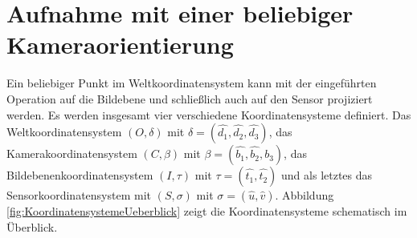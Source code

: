 
\pagebreak


\section{Aufnahme mit einer beliebiger Kameraorientierung}

Ein beliebiger Punkt im Weltkoordinatensystem kann mit der eingeführten Operation auf die Bildebene und schließlich auch auf den Sensor projiziert werden. Es werden insgesamt vier verschiedene Koordinatensysteme definiert.
Das Weltkoordinatensystem $(O,\delta)$ mit $\delta =(\hat{d_1}, \hat{d_2},\hat{d_3})$, das Kamerakoordinatensystem $(C,\beta)$ mit $\beta = (\hat{b_1},\hat{b_2},\hat{b_3})$, das Bildebenenkoordinatensystem $(I,\tau)$ mit $\tau = (\hat{t_1},\hat{t_2})$ und als letztes das Sensorkoordinatensystem mit $(S,\sigma)$ mit $\sigma = (\hat{u},\hat{v})$. Abbildung \ref{fig:KoordinatensystemeUeberblick} zeigt die Koordinatensysteme schematisch im Überblick. 


